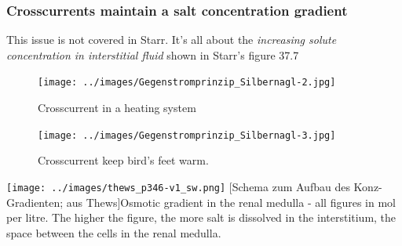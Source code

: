 	 \areaset[0cm]{11.5cm}{27.4cm}  
	 
 \subsubsection{Crosscurrents maintain a salt concentration gradient}
 This issue is not covered in Starr. It's all about the \emph{increasing solute concentration in interstitial fluid} shown in Starr's figure 37.7
 
		    \begin{figure}[htbp]
		    \begin{minipage}{0.4\textwidth}
		     \centering
		      \texttt{[image: ../images/Gegenstromprinzip\_Silbernagl-2.jpg]}
		      \caption[Gegenstromprinzip aus Silbernagl]{Crosscurrent in a heating system}  	\label{fig:GegenstromWaermetauscher}
		    \end{minipage}\hfill
		    \begin{minipage}{0.4\textwidth}
		     \centering
		      \texttt{[image: ../images/Gegenstromprinzip\_Silbernagl-3.jpg]}
		      \caption[Gegenstrom-Vogel aus Silbernagl]{Crosscurrent keep bird's feet warm.}  	\label{fig:Flamingo}
		    \end{minipage}
			 \end{figure}
 
 \vspace{2cm}
 	\begin{minipage}[htbp]{1\columnwidth}
	 {\texttt{[image: ../images/thews\_p346-v1\_sw.png]}}   [Schema zum Aufbau des Konz-Gradienten; aus Thews]{Osmotic gradient in the renal medulla - all figures in mol per litre. The higher the figure, the more salt is dissolved in the interstitium, the space between the cells in the renal medulla.}  	\label{fig:KonzVerhaeltnis}
	\vspace{2pt}
	\end{minipage}
